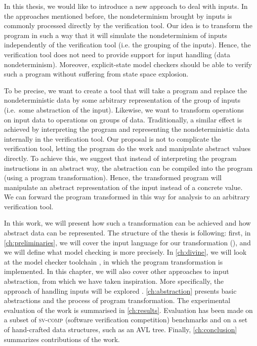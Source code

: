 In this thesis, we would like to introduce a new approach to deal with inputs.
In the approaches mentioned before, the nondeterminism brought by inputs is
commonly processed directly by the verification tool. Our idea is to transform
the program in such a way that it will simulate the nondeterminism of inputs
independently of the verification tool (i.e. the grouping of the inputs). Hence,
the verification tool does not need to provide support for input
handling (data nondeterminism). Moreover, explicit-state model
checkers should be able to verify such a program without suffering
from state space explosion.

To be precise, we want to create a tool that will take a program and replace the
nondeterministic data by some arbitrary representation of the group of inputs
(i.e.~some abstraction of the input). Likewise, we want to transform
operations on input data to operations on groups of
data. Traditionally, a
similar effect is achieved by interpreting the program and representing the
nondeterministic data internally in the verification tool. Our proposal is
not to complicate the verification tool, letting the program do the work and
manipulate abstract values directly. To achieve this, we suggest that
instead of interpreting the program instructions in an abstract way, the
abstraction can be compiled into the program (using a program
transformation). Hence, the transformed program will manipulate
an abstract representation of the input instead of a concrete value. We can
forward the program transformed in this way for analysis to an arbitrary
verification tool.


In this work, we will present how such a transformation can be achieved and how
abstract data can be represented. The structure of the thesis is following:
first, in \autoref{ch:preliminaries}, we will cover the input language for our
transformation (\LLVM), and we will define what model checking is more
precisely. In \autoref{ch:divine}, we will look at the \DIVINE model checker
toolchain \cite{Divine17}, in which the program transformation is implemented.
In this chapter, we will also cover other approaches to input abstraction,
from which we have taken inspiration. More specifically, the \SymDIVINE
approach of handling inputs will be explored \cite{Mrazek16}.
\autoref{ch:abstraction} presents basic abstractions and the process of
program transformation. The experimental evaluation of the work is summarised
in \autoref{ch:results}. Evaluation has been made on a subset of
\textsc{sv-comp} (software verification competition) benchmarks
\cite{Beyer17} and on a set of hand-crafted data structures, such as an AVL
tree. Finally, \autoref{ch:conclusion} summarizes contributions of the work.

